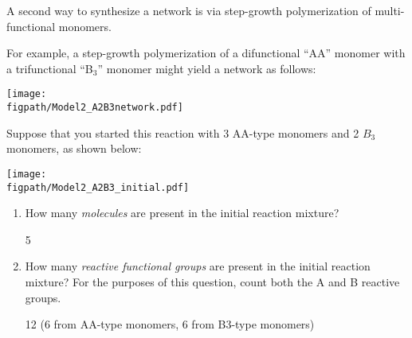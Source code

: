 \begin{activity}
\begin{ctqs}
	
			
	
\end{ctqs}

\begin{model}

	A second way to synthesize a network is via step-growth polymerization of multi-functional monomers.
	
	For example, a step-growth polymerization of a difunctional ``AA'' monomer with a trifunctional ``B$_3$'' monomer might yield a network as follows:
	
	\centerline{\texttt{[image: \\figpath/Model2\_A2B3network.pdf]}}

\end{model}

\begin{ctqs}

	\question Suppose that you started this reaction with 3 AA-type monomers and 2 $B_3$ monomers, as shown below:
	
	\vspace{6pt}
		\centerline{\texttt{[image: \\figpath/Model2\_A2B3\_initial.pdf]}}
	
		\begin{enumerate}
			\item How many \emph{molecules} are present in the initial reaction mixture?
			
				\begin{solution}[0.75in]
					5
				\end{solution}
			
			\item How many \emph{reactive functional groups} are present in the initial reaction mixture?  For the purposes of this question, count both the A and B reactive groups.
			
				\begin{solution}[0.5in]
					12 (6 from AA-type monomers, 6 from B3-type monomers)
				\end{solution}
			

\end{enumerate}
\end{ctqs}
\end{activity}
